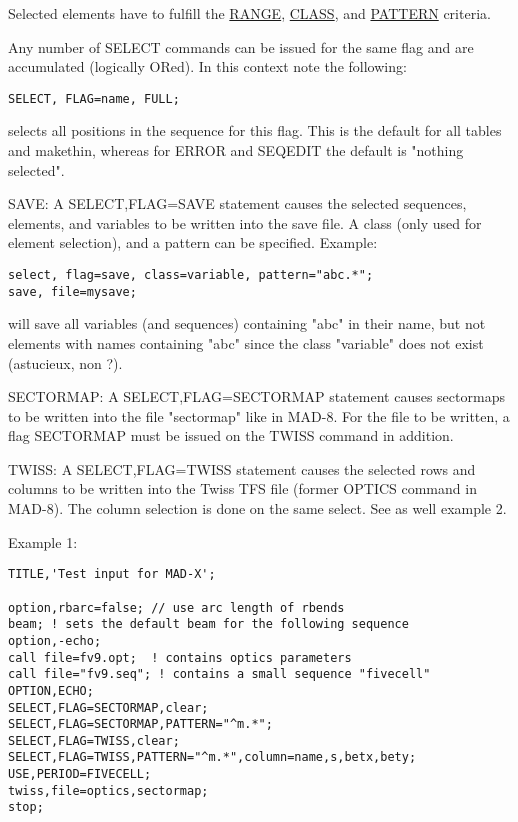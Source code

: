 Selected elements have to fulfill the \href{ranges.html#range}{RANGE},
\href{ranges.html#class}{CLASS}, and \href{wildcard.html}{PATTERN}
criteria.  

Any number of SELECT commands can be issued for the same flag and are
accumulated (logically ORed). In this context note the following:  

\begin{verbatim}
SELECT, FLAG=name, FULL;
\end{verbatim} 
selects all positions in the sequence for this flag. This is the default
for all tables and makethin, whereas for ERROR and SEQEDIT the default
is "nothing selected".  

\label{save_select}
SAVE: A SELECT,FLAG=SAVE statement causes the
selected sequences, elements, and variables to be written into the save
file. A class (only used for element selection), and a pattern can be
specified. Example:  
\begin{verbatim}
select, flag=save, class=variable, pattern="abc.*";
save, file=mysave;
\end{verbatim} 
will save all variables (and sequences) containing "abc" in their name,
but not elements with names containing "abc" since the class "variable"
does not exist (astucieux, non ?).  

SECTORMAP: A SELECT,FLAG=SECTORMAP statement causes sectormaps to be
written into the file "sectormap" like in MAD-8. For the file to be
written, a flag SECTORMAP must be issued on the TWISS command in
addition.  

TWISS: A SELECT,FLAG=TWISS statement causes the selected rows and
columns to be written into the Twiss TFS file (former OPTICS command in
MAD-8). The column selection is done on the same select. See as well
example 2.  

Example 1:  
\begin{verbatim}
TITLE,'Test input for MAD-X';

option,rbarc=false; // use arc length of rbends
beam; ! sets the default beam for the following sequence
option,-echo;
call file=fv9.opt;  ! contains optics parameters
call file="fv9.seq"; ! contains a small sequence "fivecell"
OPTION,ECHO;
SELECT,FLAG=SECTORMAP,clear;
SELECT,FLAG=SECTORMAP,PATTERN="^m.*";
SELECT,FLAG=TWISS,clear;
SELECT,FLAG=TWISS,PATTERN="^m.*",column=name,s,betx,bety;
USE,PERIOD=FIVECELL;
twiss,file=optics,sectormap;
stop;
\end{verbatim} 

